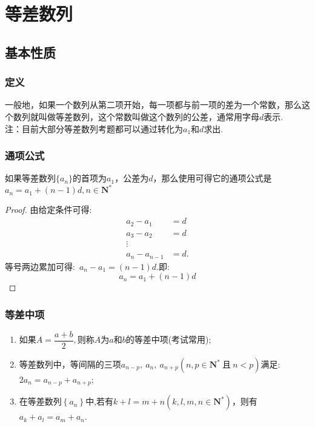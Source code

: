 \documentclass{BHCexam}
\begin{document}
\section{等差数列}
\subsection{基本性质} 
\subsubsection{定义}
一般地，如果一个数列从第二项开始，每一项都与前一项的差为一个常数，那么这个数列就叫做等差数列，这个常数叫做这个数列的公差，通常用字母$ d $表示.\\
{\kaishu 注：目前大部分等差数列考题都可以通过转化为$ a_1 $和$ d $求出.}
\subsubsection{通项公式}
如果等差数列$\{a_n\}$的首项为$ a_1 $，公差为$ d $，那么使用可得它的通项公式是$ a_n=a_1+(n-1)d ,n\in\mathbf{N^*}$
\begin{proof}
由给定条件可得:\begin{equation*}
\begin{aligned}
 a_2-a_1& =d\\
a_3-a_2&=d\\
\vdots&\\
a_n-a_{n-1}&=d.
\end{aligned}
\end{equation*}
等号两边累加可得:~$ a_n-a_1=(n-1)d .$即:~$$a_n=a_1+(n-1)d$$
\end{proof}
\subsubsection{等差中项}
\begin{enumerate}[1)]
\item 如果$ A=\dfrac{a+b}{2} ,$则称$ A $为$ a $和$ b $的等差中项(考试常用);
\item 等差数列中，等间隔的三项$a_{n-p},~a_n,~a_{n+p} (n,p\in\mathbf{N^*}~\text{且}~n<p) $满足:$ 2a_n=a_{n-p}+a_{n+p} $;
\item 在等差数列$ \left\{a_n\right\} $中,若有$ k+l=m+n \left(k,l,m,n\in\mathbf{N^*}\right)$，则有$ a_k+a_l=a_m+a_n $.
\end{enumerate}
\end{document}
